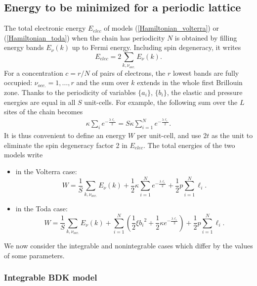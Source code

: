 \documentclass[]{revtex4-1}
\begin{document}
\subsection{Energy to be minimized for a periodic lattice}

The total electronic energy $E_{elec}$ of models  (\ref{Hamiltonian_volterra}) or (\ref{Hamiltonian_toda}) when the chain has periodicity $N$ is obtained by filling energy bands $E_{\nu}(k)$ up to Fermi energy. Including spin degeneracy, it writes
\begin{equation}
E_{elec} =  2 \sum_{k, \nu_{occ.}} E_{\nu}(k).
  \end{equation}
For a concentration $c=r/N$ of pairs of electrons, the $r$ lowest bands are fully occupied: $\nu_{occ.}=1,\dots,r$ and the sum over $k$ extends in the whole first Brillouin zone. Thanks to the periodicity of variables $\{a_i\}$, $\{b_i\}$, the elastic and pressure energies are equal in all $S$ unit-cells. For example, the following sum over the $L$ sites of the chain becomes
\begin{eqnarray}
\kappa \sum_{i}   e^{-\frac{\lambda \ell_i}{2}}  =  S \kappa \sum_{i=1}^{N}   e^{-\frac{\lambda \ell_i}{2}}.
\end{eqnarray}
It is thus convenient to define an energy $W$ per unit-cell, and use $2t$ as the unit to eliminate the spin degeneracy factor 2 in $E_{elec}$. The total energies of the two models write
\begin{itemize}
  \item in the Volterra case: \begin{equation}
W= \frac{1}{S}   \sum_{k, \nu_{occ.}} E_{\nu}(k)  +   \frac{1}{2}\kappa \sum_{i=1}^{N}   e^{-\frac{\lambda \ell_i}{2}}   + \frac{1}{2}p \sum_{i=1}^{N} \ell_i.
\label{Wminim0} \end{equation}
\item in the Toda case: \begin{equation}
W= \frac{1}{S}   \sum_{k, \nu_{occ.}} E_{\nu}(k)  +   \sum_{i=1}^{N} \left(\frac{1}{2}\xi {b_i}^2+ \frac{1}{2}\kappa e^{-\frac{\lambda \ell_i}{2}} \right)  + \frac{1}{2}p \sum_{i=1}^{N} \ell_i.
\label{Wminim} \end{equation} \end{itemize}
We now consider the integrable and nonintegrable cases which differ by the values of some parameters. 



\subsubsection{Integrable BDK model}
\end{document}
